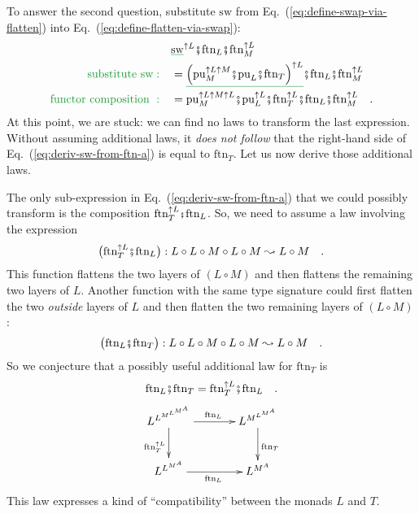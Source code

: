 To answer the second question, substitute $\text{sw}$ from Eq.~(\ref{eq:define-swap-via-flatten})
into Eq.~(\ref{eq:define-flatten-via-swap}):
\begin{align}
 & \gunderline{\text{sw}}^{\uparrow L}\bef\text{ftn}_{L}\bef\text{ftn}_{M}^{\uparrow L}\nonumber \\
{\color{greenunder}\text{substitute }\text{sw}:}\quad & =\gunderline{\left(\text{pu}_{M}^{\uparrow L\uparrow M}\bef\text{pu}_{L}\bef\text{ftn}_{T}\right)^{\uparrow L}}\bef\text{ftn}_{L}\bef\text{ftn}_{M}^{\uparrow L}\nonumber \\
{\color{greenunder}\text{functor composition }:}\quad & =\text{pu}_{M}^{\uparrow L\uparrow M\uparrow L}\bef\text{pu}_{L}^{\uparrow L}\bef\text{ftn}_{T}^{\uparrow L}\bef\text{ftn}_{L}\bef\text{ftn}_{M}^{\uparrow L}\quad.\label{eq:deriv-sw-from-ftn-a}
\end{align}
At this point, we are stuck: we can find no laws to transform the
last expression. Without assuming additional laws, it \emph{does not
follow} that the right-hand side of Eq.~(\ref{eq:deriv-sw-from-ftn-a})
is equal to $\text{ftn}_{T}$. Let us now derive those additional
laws. 

The only sub-expression in Eq.~(\ref{eq:deriv-sw-from-ftn-a}) that
we could possibly transform is the composition $\text{ftn}_{T}^{\uparrow L}\bef\text{ftn}_{L}$.
So, we need to assume a law involving the expression 
\[
\big(\text{ftn}_{T}^{\uparrow L}\bef\text{ftn}_{L}\big):L\circ L\circ M\circ L\circ M\leadsto L\circ M\quad.
\]
This function flattens the two layers of $\left(L\circ M\right)$
and then flattens the remaining two layers of $L$. Another function
with the same type signature could first flatten the two \emph{outside}
layers of $L$ and then flatten the two remaining layers of $\left(L\circ M\right)$:
\[
\big(\text{ftn}_{L}\bef\text{ftn}_{T}\big):L\circ L\circ M\circ L\circ M\leadsto L\circ M\quad.
\]
So we conjecture that a possibly useful additional law for $\text{ftn}_{T}$
is 
\[
\text{ftn}_{L}\bef\text{ftn}_{T}=\text{ftn}_{T}^{\uparrow L}\bef\text{ftn}_{L}\quad.
\]
\[
\xymatrix{\xyScaleY{2pc}\xyScaleX{3pc}L^{L^{M^{L^{M^{A}}}}}\ar[r]\sp(0.5){\text{ftn}_{L}}\ar[d]\sb(0.5){\text{ftn}_{T}^{\uparrow L}} & L^{M^{L^{M^{A}}}}\ar[d]\sp(0.5){\text{ftn}_{T}}\\
L^{L^{M^{A}}}\ar[r]\sb(0.5){\text{ftn}_{L}} & L^{M^{A}}
}
\]
This law expresses a kind of ``compatibility'' between the monads
$L$ and $T$.


